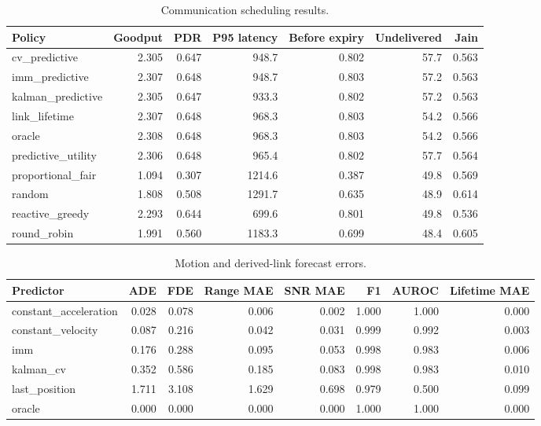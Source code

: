 \begin{table}[t]
\centering
\caption{Communication scheduling results.}
\begin{tabular}{lrrrrrr}
\toprule
Policy & Goodput & PDR & P95 latency & Before expiry & Undelivered & Jain \\
\midrule
cv\_predictive & 2.305 & 0.647 & 948.7 & 0.802 & 57.7 & 0.563 \\
imm\_predictive & 2.307 & 0.648 & 948.7 & 0.803 & 57.2 & 0.563 \\
kalman\_predictive & 2.305 & 0.647 & 933.3 & 0.802 & 57.2 & 0.563 \\
link\_lifetime & 2.307 & 0.648 & 968.3 & 0.803 & 54.2 & 0.566 \\
oracle & 2.308 & 0.648 & 968.3 & 0.803 & 54.2 & 0.566 \\
predictive\_utility & 2.306 & 0.648 & 965.4 & 0.802 & 57.7 & 0.564 \\
proportional\_fair & 1.094 & 0.307 & 1214.6 & 0.387 & 49.8 & 0.569 \\
random & 1.808 & 0.508 & 1291.7 & 0.635 & 48.9 & 0.614 \\
reactive\_greedy & 2.293 & 0.644 & 699.6 & 0.801 & 49.8 & 0.536 \\
round\_robin & 1.991 & 0.560 & 1183.3 & 0.699 & 48.4 & 0.605 \\
\bottomrule
\end{tabular}
\end{table}

\begin{table}[t]
\centering
\caption{Motion and derived-link forecast errors.}
\begin{tabular}{lrrrrrrr}
\toprule
Predictor & ADE & FDE & Range MAE & SNR MAE & F1 & AUROC & Lifetime MAE \\
\midrule
constant\_acceleration & 0.028 & 0.078 & 0.006 & 0.002 & 1.000 & 1.000 & 0.000 \\
constant\_velocity & 0.087 & 0.216 & 0.042 & 0.031 & 0.999 & 0.992 & 0.003 \\
imm & 0.176 & 0.288 & 0.095 & 0.053 & 0.998 & 0.983 & 0.006 \\
kalman\_cv & 0.352 & 0.586 & 0.185 & 0.083 & 0.998 & 0.983 & 0.010 \\
last\_position & 1.711 & 3.108 & 1.629 & 0.698 & 0.979 & 0.500 & 0.099 \\
oracle & 0.000 & 0.000 & 0.000 & 0.000 & 1.000 & 1.000 & 0.000 \\
\bottomrule
\end{tabular}
\end{table}

